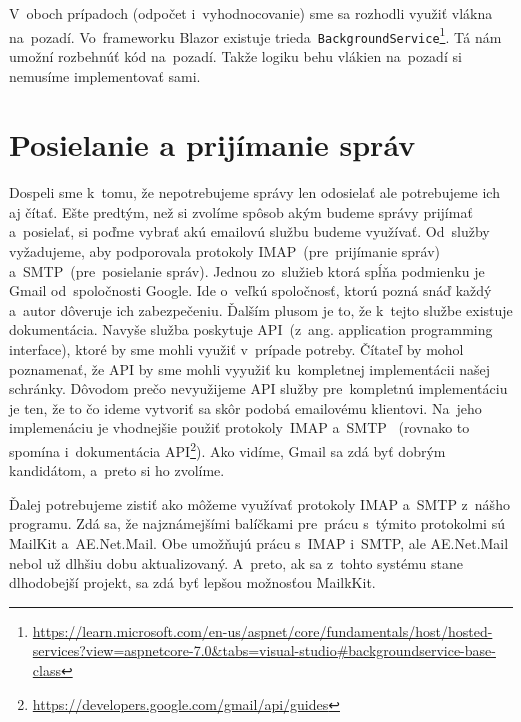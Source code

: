 V~oboch prípadoch (odpočet i~vyhodnocovanie) sme sa rozhodli využiť vlákna na~pozadí. Vo~frameworku Blazor existuje trieda~\verb|BackgroundService|\footnote{\url{https://learn.microsoft.com/en-us/aspnet/core/fundamentals/host/hosted-services?view=aspnetcore-7.0&tabs=visual-studio\#backgroundservice-base-class}}. Tá nám umožní rozbehnúť kód na~pozadí. Takže logiku behu vlákien na~pozadí si nemusíme implementovať sami.

\section{Posielanie a prijímanie správ}

Dospeli sme k~tomu, že nepotrebujeme správy len odosielať ale potrebujeme ich aj čítať. Ešte predtým, než si zvolíme spôsob akým budeme správy prijímať a~posielať, si poďme vybrať akú emailovú službu budeme využívať. Od~služby vyžadujeme, aby podporovala protokoly IMAP~(pre~prijímanie správ) a~SMTP~(pre~posielanie správ). Jednou zo~služieb ktorá spĺňa podmienku je Gmail od~spoločnosti Google. Ide o~veľkú spoločnosť, ktorú pozná snáď každý a~autor dôveruje ich zabezpečeniu. Ďalším plusom je to, že k~tejto službe existuje dokumentácia. Navyše služba poskytuje API~(z~ang. application programming interface), ktoré by sme mohli využiť v~prípade potreby. Čítateľ by mohol poznamenať, že API by sme mohli vyyužiť ku~kompletnej implementácii našej schránky. Dôvodom prečo nevyužijeme API služby pre~kompletnú implementáciu je ten, že to čo ideme vytvoriť sa skôr podobá emailovému klientovi. Na~jeho implemenáciu je vhodnejšie použiť protokoly~IMAP a~SMTP ~(rovnako to spomína i~dokumentácia API\footnote{\url{https://developers.google.com/gmail/api/guides}}). Ako vidíme, Gmail sa zdá byť dobrým kandidátom, a~preto si ho zvolíme.

Ďalej potrebujeme zistiť ako môžeme využívať protokoly IMAP a~SMTP z~nášho programu. Zdá sa, že najznámejšími balíčkami pre~prácu s~týmito protokolmi sú MailKit a~AE.Net.Mail. Obe umožňujú prácu s~IMAP i~SMTP, ale AE.Net.Mail nebol už dlhšiu dobu aktualizovaný. A~preto, ak sa z~tohto systému stane dlhodobejší projekt, sa zdá byť lepšou možnosťou MailkKit.


\fi
